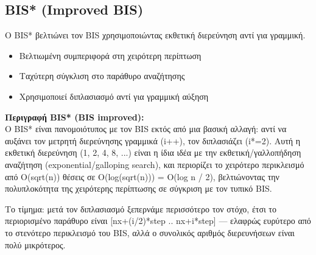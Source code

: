 \documentclass[a4paper,12pt]{article}
\begin{document}
	\subsection{BIS* (Improved BIS)}
	
	Ο BIS* βελτιώνει τον BIS χρησιμοποιώντας εκθετική διερεύνηση αντί για γραμμική.
	
	\begin{itemize}
		\item Βελτιωμένη συμπεριφορά στη χειρότερη περίπτωση
		\item Ταχύτερη σύγκλιση στο παράθυρο αναζήτησης
		\item Χρησιμοποιεί διπλασιασμό αντί για γραμμική αύξηση
	\end{itemize}
	
	\textbf{Περιγραφή BIS* (BIS improved):}\\
	Ο BIS* είναι πανομοιότυπος με τον BIS εκτός από μια βασική αλλαγή: αντί να αυξάνει τον μετρητή διερεύνησης γραμμικά (i++), τον διπλασιάζει (i*=2). Αυτή η εκθετική διερεύνηση (1, 2, 4, 8, ...) είναι η ίδια ιδέα με την εκθετική/γαλλοπήδηση αναζήτηση (exponential/galloping search), και περιορίζει το χειρότερο περικλεισμό από O(sqrt(n)) θέσεις σε O(log(sqrt(n))) = O(log n / 2), βελτιώνοντας την πολυπλοκότητα της χειρότερης περίπτωσης σε σύγκριση με τον τυπικό BIS.
	
	Το τίμημα: μετά τον διπλασιασμό ξεπερνάμε περισσότερο τον στόχο, έτσι το περιορισμένο παράθυρο είναι [nx+(i/2)*step .. nx+i*step] — ελαφρώς ευρύτερο από το στενότερο περικλεισμό του BIS, αλλά ο συνολικός αριθμός διερευνήσεων είναι πολύ μικρότερος.
	
\end{document}
